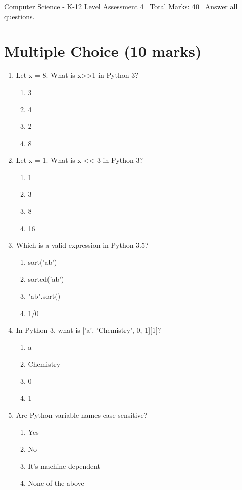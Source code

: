 \documentclass[12pt]{article}
\begin{document}
\begin{center}
Computer Science - K-12 Level Assessment 4 \
Total Marks: 40 \
Answer all questions.
\end{center}

\section*{Multiple Choice (10 marks)}
\begin{enumerate}[label=\arabic*.]
\item Let x = 8. What is x\textgreater{}\textgreater{}1 in Python 3?
\begin{enumerate}[label=(\alph*)]
    \item 3
    \item 4
    \item 2
    \item 8
\end{enumerate}
\item Let x = 1. What is x \textless{}\textless{} 3 in Python 3?
\begin{enumerate}[label=(\alph*)]
    \item 1
    \item 3
    \item 8
    \item 16
\end{enumerate}
\item Which is a valid expression in Python 3.5?
\begin{enumerate}[label=(\alph*)]
    \item sort('ab')
    \item sorted('ab')
    \item "ab".sort()
    \item 1/0
\end{enumerate}
\item In Python 3, what is ['a', 'Chemistry', 0, 1][1]?
\begin{enumerate}[label=(\alph*)]
    \item a
    \item Chemistry
    \item 0
    \item 1
\end{enumerate}
\item Are Python variable names case-sensitive?
\begin{enumerate}[label=(\alph*)]
    \item Yes
    \item No
    \item It's machine-dependent
    \item None of the above
\end{enumerate}
\end{enumerate}
\end{document}
